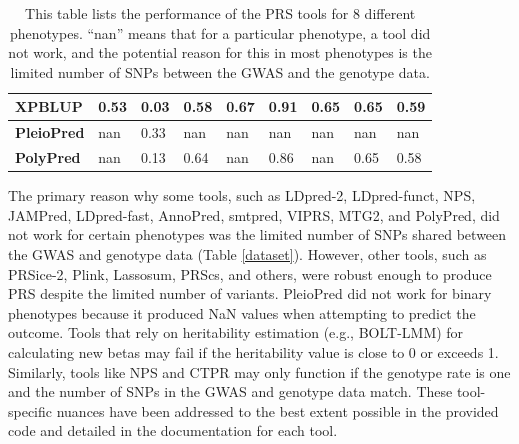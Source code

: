 \documentclass[pdflatex,sn-nature]{sn-jnl}%
\begin{document}
\begin{table}[!ht]
{\begin{tabular}{|l|l|l|l|l|l|l|l|l|}
\textbf{XPBLUP}  \cite{Zhang_2023}            & \cellcolor[HTML]{FEDC81}0.53 & \cellcolor[HTML]{F86F6C}0.03 & \cellcolor[HTML]{FEE683}0.58 & \cellcolor[HTML]{F8696B}0.67                                                     & \cellcolor[HTML]{92CC7E}0.91                                         & \cellcolor[HTML]{C0D981}0.65                                                 & \cellcolor[HTML]{96CD7E}0.65                                                    & \cellcolor[HTML]{77C47D}0.59 \\ \hline
\textbf{PleioPred}   \cite{Weissbrod_2022}        & nan                          & \cellcolor[HTML]{A1D07F}0.33 & nan                          & nan                                                                              & nan                                                                  & nan                                                                          & nan                                                                             & nan                          \\ \hline
\textbf{PolyPred}    \cite{Hu_2017}        & nan                          & \cellcolor[HTML]{FBAB77}0.13 & \cellcolor[HTML]{63BE7B}0.64 & nan                                                                              & \cellcolor[HTML]{F9EA84}0.86                                         & nan                                                                          & \cellcolor[HTML]{9CCF7F}0.65                                                    & \cellcolor[HTML]{92CC7E}0.58 \\ \hline
\end{tabular}
}
\caption{This table lists the performance of the PRS tools for 8 different phenotypes. ``nan'' means that for a particular phenotype, a tool did not work, and the potential reason for this in most phenotypes is the limited number of SNPs between the GWAS and the genotype data.
}
\label{Table1Results}
\end{table}


The primary reason why some tools, such as LDpred-2, LDpred-funct, NPS, JAMPred, LDpred-fast, AnnoPred, smtpred, VIPRS, MTG2, and PolyPred, did not work for certain phenotypes was the limited number of SNPs shared between the GWAS and genotype data (Table \ref{dataset}). However, other tools, such as PRSice-2, Plink, Lassosum, PRScs, and others, were robust enough to produce PRS despite the limited number of variants. PleioPred did not work for binary phenotypes because it produced NaN values when attempting to predict the outcome. Tools that rely on heritability estimation (e.g., BOLT-LMM) for calculating new betas may fail if the heritability value is close to 0 or exceeds 1. Similarly, tools like NPS and CTPR may only function if the genotype rate is one and the number of SNPs in the GWAS and genotype data match. These tool-specific nuances have been addressed to the best extent possible in the provided code and detailed in the documentation for each tool.
\end{document}
